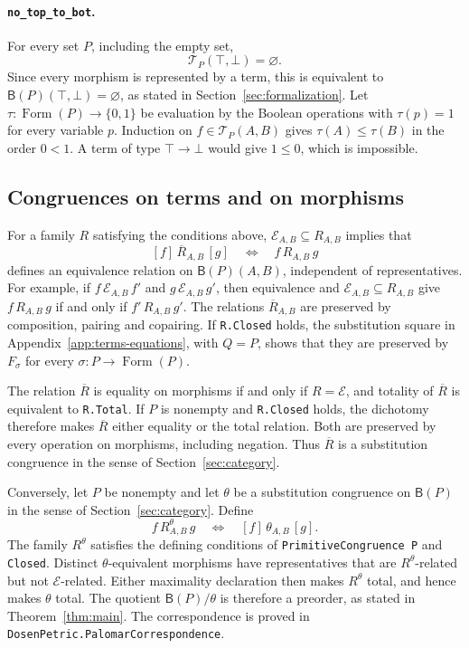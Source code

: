 \documentclass[11pt]{article}
\newcommand{\B}{\mathsf B}
\newcommand{\FormulaSet}{\operatorname{Form}}
\begin{document}
\paragraph{\texttt{no\_top\_to\_bot}.}
For every set $P$, including the empty set,
\[
 \mathcal T_P(\top,\bot)=\varnothing.
\]
Since every morphism is represented by a term, this is equivalent to
$\B(P)(\top,\bot)=\varnothing$, as stated in
Section~\ref{sec:formalization}.
Let $\tau:\FormulaSet(P)\to\{0,1\}$ be evaluation by the Boolean
operations with $\tau(p)=1$ for every variable $p$.
Induction on $f\in\mathcal T_P(A,B)$ gives $\tau(A)\leq\tau(B)$
in the order $0<1$. A term of type
$\top\to\bot$ would give $1\leq0$, which is impossible.

\subsection{Congruences on terms and on morphisms}

For a family $R$ satisfying the conditions above,
$\mathcal E_{A,B}\subseteq R_{A,B}$ implies that
\[
 [f]\,\overline R_{A,B}\,[g]
 \quad\Longleftrightarrow\quad f\,R_{A,B}\,g
\]
defines an equivalence relation on $\B(P)(A,B)$, independent of
representatives. For example, if
$f\,\mathcal E_{A,B}\,f'$ and $g\,\mathcal E_{A,B}\,g'$, then
equivalence and $\mathcal E_{A,B}\subseteq R_{A,B}$ give
$f\,R_{A,B}\,g$ if and only if $f'\,R_{A,B}\,g'$.
The relations $\overline R_{A,B}$ are preserved by composition,
pairing and copairing. If \texttt{R.Closed} holds, the substitution
square in Appendix~\ref{app:terms-equations}, with $Q=P$, shows
that they are preserved by $F_\sigma$ for
every $\sigma:P\to\FormulaSet(P)$.

The relation $\overline R$ is equality on morphisms if and only if
$R=\mathcal E$, and totality of $\overline R$ is equivalent to
\texttt{R.Total}. If $P$ is nonempty and \texttt{R.Closed} holds, the dichotomy
therefore makes $\overline R$ either equality or the total relation. Both are preserved
by every operation on morphisms, including negation. Thus $\overline R$ is a
substitution congruence in the sense of Section~\ref{sec:category}.

Conversely, let $P$ be nonempty and let $\theta$ be a substitution
congruence on $\B(P)$ in the sense of Section~\ref{sec:category}.
Define
\[
 f\,R^\theta_{A,B}\,g
 \quad\Longleftrightarrow\quad [f]\,\theta_{A,B}\,[g].
\]
The family $R^\theta$ satisfies the defining conditions of
\texttt{PrimitiveCongruence P} and \texttt{Closed}.
Distinct $\theta$-equivalent morphisms have representatives that are
$R^\theta$-related but not $\mathcal E$-related. Either maximality
declaration then makes $R^\theta$ total, and hence makes $\theta$ total.
The quotient $\B(P)/\theta$ is therefore a preorder, as stated in
Theorem~\ref{thm:main}.
The correspondence is proved in
\texttt{DosenPetric.\allowbreak{}PalomarCorrespondence}.
\end{document}
